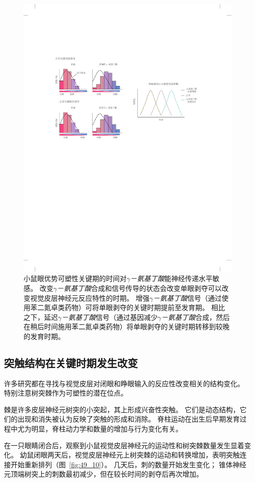 \begin{figure}[htbp]
	\centering
	\includegraphics[width=0.65\linewidth]{chap49/fig_49_9}
	\caption{小鼠眼优势可塑性关键期的时间对\textit{$\gamma$－氨基丁酸}能神经传递水平敏感。
		改变\textit{$\gamma$－氨基丁酸}合成和信号传导的状态会改变单眼剥夺可以改变视觉皮层神经元反应特性的时期。
		增强\textit{$\gamma$－氨基丁酸}信号（通过使用苯二氮卓类药物）可将单眼剥夺的关键时期提前至发育期。
		相比之下，延迟\textit{$\gamma$－氨基丁酸}信号（通过基因减少\textit{$\gamma$－氨基丁酸}合成，然后在稍后时间施用苯二氮卓类药物）将单眼剥夺的关键时期转移到较晚的发育时期\cite{daw1998critical}。}
	\label{fig:49_9}
\end{figure}



\subsection{突触结构在关键时期发生改变}

许多研究都在寻找与视觉皮层对闭眼和睁眼输入的反应性改变相关的结构变化。
特别注意树突棘作为可塑性的潜在位点。


棘是许多皮层神经元树突的小突起，其上形成兴奋性突触。
它们是动态结构，它们的出现和消失被认为反映了突触的形成和消除。
脊柱运动在出生后早期发育过程中尤为明显，脊柱动力学和数量的增加与行为变化有关。


在一只眼睛闭合后，观察到小鼠视觉皮层神经元的运动性和树突棘数量发生显着变化。
幼鼠闭眼两天后，视觉皮层神经元上树突棘的运动和转换增加，表明突触连接开始重新排列（图~\ref{fig:49_10}）。
几天后，刺的数量开始发生变化；
锥体神经元顶端树突上的刺数最初减少，但在较长时间的剥夺后再次增加。


